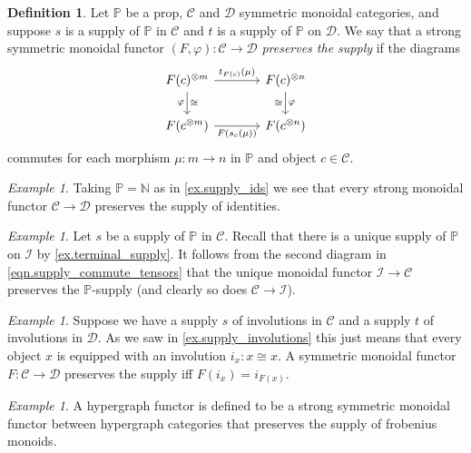 \documentclass[11pt, oneside, article]{memoir}
\theoremstyle{plain}
\theoremstyle{definition}
\newtheorem{definition}[theorem]{Definition}
\theoremstyle{remark}
\newtheorem{example}[theorem]{Example}
\newcommand{\cat}[1]{\mathcal{#1}}%
\newcommand{\tpow}[1]{^{\otimes #1}}
\newcommand{\nn}{\mathbb{N}}
\newcommand{\pp}{\mathbb{P}}
\newcommand{\zero}{\cat{I}}
\begin{document}
\begin{definition}\label{def.preserve_supply}
Let $\pp$ be a prop, $\cat{C}$ and $\cat{D}$ symmetric monoidal categories, and suppose $s$ is a supply of $\pp$ in $\cat{C}$ and $t$ is a supply of $\pp$ on $\cat{D}$. We say that a strong symmetric monoidal functor $(F,\varphi)\colon\cat{C}\to\cat{D}$ \emph{preserves the supply} if the diagrams 
\begin{equation}\label{eqn.unpack_preserve_supply}
	\begin{tikzcd}[column sep=large]
  	F(c)\tpow{m}\ar[r, "t_{F(c)}(\mu)"]\ar[d, "\varphi"', "\cong"]&
  	F(c)\tpow{n}\ar[d, "\varphi", "\cong"']\\
  	F(c\tpow{m})\ar[r, "F(s_c(\mu))"']&
  	F(c\tpow{n})
  \end{tikzcd}
\end{equation}
commutes for each morphism $\mu\colon m\to n$ in $\pp$ and object $c\in\cat{C}$.
\end{definition}

\begin{example}
Taking $\pp=\nn$ as in \cref{ex.supply_ids} we see that every strong monoidal functor $\cat{C}\to\cat{D}$ preserves the supply of identities.
\end{example}

\begin{example}
Let $s$ be a supply of $\pp$ in $\cat{C}$. Recall that there is a unique supply of $\pp$ on $\zero$ by \cref{ex.terminal_supply}. It follows from the second diagram in \cref{eqn.supply_commute_tensors} that the unique monoidal functor $\zero\to\cat{C}$ preserves the $\pp$-supply (and clearly so does $\cat{C}\to\zero$).
\end{example}

\begin{example}\label{ex.preserve_involutions}
Suppose we have a supply $s$ of involutions in $\cat{C}$ and a supply $t$ of involutions in $\cat{D}$. As we saw in \cref{ex.supply_involutions} this just means that every object $x$ is equipped with an involution $i_x\colon x\cong x$. A symmetric monoidal functor $F\colon\cat{C}\to\cat{D}$ preserves the supply iff $F(i_x)=i_{F(x)}$.
\end{example}

\begin{example}
  A hypergraph functor is defined to be a strong symmetric monoidal functor between hypergraph categories that preserves the supply of frobenius monoids.
\end{example}
\end{document}
